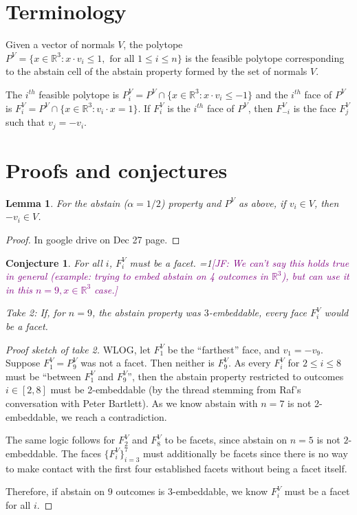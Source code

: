 \documentclass[12pt]{article}
\newcommand{\Comments}{1}
\newcommand{\mynote}[2]{\ifnum\Comments=1\textcolor{#1}{#2}\fi}
\newcommand{\jessie}[1]{\mynote{purple}{[JF: #1]}}
\newcommand{\reals}{\mathbb{R}}
\newtheorem{lemma}{Lemma}
\newtheorem{conjecture}{Conjecture}
\begin{document}
\section{Terminology}
	Given a vector of normals $V$, the polytope $P^V = \{ x \in \reals^3 : x \cdot v_i \leq 1, \text{ for all } 1 \leq i \leq n \}$ is the feasible polytope corresponding to the abstain cell of the abstain property formed by the set of normals $V$.
	
	The $i^{th}$ feasible polytope is $P_i^V = P^V \cap \{x \in \reals^3 : x \cdot v_i \leq -1 \}$ and the $i^{th}$ face of $P^V$ is $F_i^V = P^V \cap \{ x \in \reals^3 : v_i \cdot x = 1 \}$.
	If $F^V_i$ is the $i^{th}$ face of $P^V$, then $F^V_{-i}$ is the face $F^V_j$ such that $v_j = -v_i$.

\section{Proofs and conjectures}

\begin{lemma}
	For the abstain ($\alpha = 1/2$) property and $P^V$ as above, if $v_i \in V$, then $-v_i \in V$.
\end{lemma}
\begin{proof}
	In google drive on Dec 27 page.
\end{proof}

\begin{conjecture}\label{conj:each-face-facet}
	For all $i$, $F_i^V$ must be a facet.
		\jessie{We can't say this holds true in general (example: trying to embed abstain on 4 outcomes in $\reals^3$), but can use it in this $n=9, x \in \reals^3$ case.}
		
		Take 2: If, for $n = 9$, the abstain property was $3$-embeddable, every face $F_i^V$ would be a facet.
\end{conjecture}
\begin{proof}[Proof sketch of take 2]
	WLOG, let $F_1^V$ be the ``farthest'' face, and $v_1 = -v_9$.
	Suppose $F_1^V = P_9^V$ was not a facet.
	Then neither is $F_9^V$.
	As every $F_i^V$ for $2 \leq i \leq 8$ must be ``between $F_1^V$ and $F_9^V$'', then the abstain property restricted to outcomes $i \in [2,8]$ must be 2-embeddable (by the thread stemming from Raf's conversation with Peter Bartlett).
	As we know abstain with $n=7$ is not 2-embeddable, we reach a contradiction.
	
	The same logic follows for $F_2^V$ and $F_8^V$ to be facets, since abstain on $n=5$ is not $2$-embeddable.
	The faces $\{F_i^V \}_{i=3}^7$ must additionally be facets since there is no way to make contact with the first four established facets without being a facet itself.

	Therefore, if abstain on $9$ outcomes is $3$-embeddable, we know $F_i^V$ must be a facet for all $i$.
\end{proof}
\end{document}
